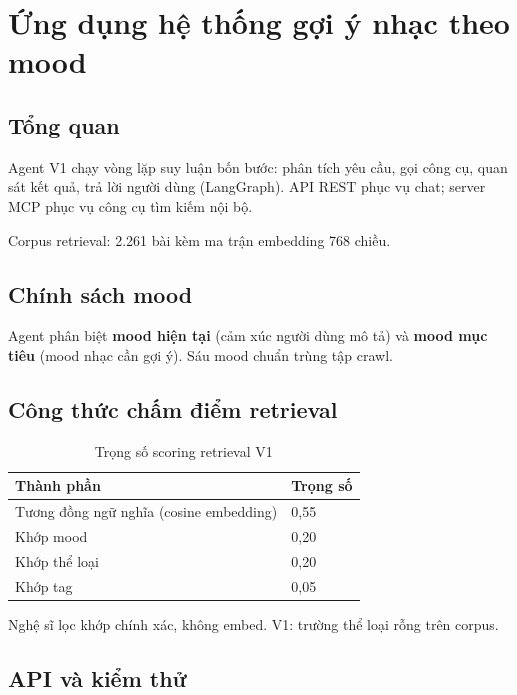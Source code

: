 \chapter{Ứng dụng hệ thống gợi ý nhạc theo mood}
\label{ch:ungdung}

\section{Tổng quan}

Agent V1 chạy vòng lặp suy luận bốn bước: phân tích yêu cầu, gọi công cụ, quan sát kết quả, trả lời người dùng (LangGraph). API REST phục vụ chat; server MCP phục vụ công cụ tìm kiếm nội bộ.

Corpus retrieval: 2.261 bài kèm ma trận embedding 768 chiều.

\section{Chính sách mood}

Agent phân biệt \textbf{mood hiện tại} (cảm xúc người dùng mô tả) và \textbf{mood mục tiêu} (mood nhạc cần gợi ý). Sáu mood chuẩn trùng tập crawl.

\section{Công thức chấm điểm retrieval}

\begin{table}[htbp]
  \centering
  \caption{Trọng số scoring retrieval V1}
  \label{tab:scoring}
  \begin{tabular}{@{}ll@{}}
    \toprule
    \textbf{Thành phần} & \textbf{Trọng số} \\
    \midrule
    Tương đồng ngữ nghĩa (cosine embedding) & 0{,}55 \\
    Khớp mood & 0{,}20 \\
    Khớp thể loại & 0{,}20 \\
    Khớp tag & 0{,}05 \\
    \bottomrule
  \end{tabular}
\end{table}

Nghệ sĩ lọc khớp chính xác, không embed. V1: trường thể loại rỗng trên corpus.

\section{API và kiểm thử}

